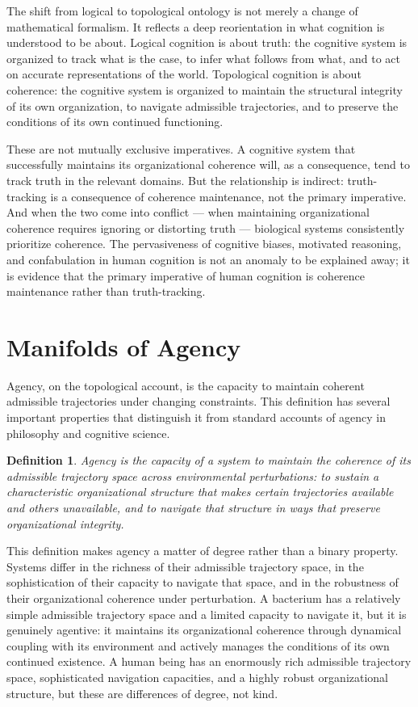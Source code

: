 \documentclass[12pt,a4paper]{report}
\theoremstyle{flyxion}
\newtheorem{definition}[theorem]{Definition}
\begin{document}
The shift from logical to topological ontology is not merely a change of mathematical formalism. It reflects a deep reorientation in what cognition is understood to be about. Logical cognition is about truth: the cognitive system is organized to track what is the case, to infer what follows from what, and to act on accurate representations of the world. Topological cognition is about coherence: the cognitive system is organized to maintain the structural integrity of its own organization, to navigate admissible trajectories, and to preserve the conditions of its own continued functioning.

These are not mutually exclusive imperatives. A cognitive system that successfully maintains its organizational coherence will, as a consequence, tend to track truth in the relevant domains. But the relationship is indirect: truth-tracking is a consequence of coherence maintenance, not the primary imperative. And when the two come into conflict --- when maintaining organizational coherence requires ignoring or distorting truth --- biological systems consistently prioritize coherence. The pervasiveness of cognitive biases, motivated reasoning, and confabulation in human cognition is not an anomaly to be explained away; it is evidence that the primary imperative of human cognition is coherence maintenance rather than truth-tracking.

\section{Manifolds of Agency}

Agency, on the topological account, is the capacity to maintain coherent admissible trajectories under changing constraints. This definition has several important properties that distinguish it from standard accounts of agency in philosophy and cognitive science.

\begin{definition}
\emph{Agency} is the capacity of a system to maintain the coherence of its admissible trajectory space across environmental perturbations: to sustain a characteristic organizational structure that makes certain trajectories available and others unavailable, and to navigate that structure in ways that preserve organizational integrity.
\end{definition}

This definition makes agency a matter of degree rather than a binary property. Systems differ in the richness of their admissible trajectory space, in the sophistication of their capacity to navigate that space, and in the robustness of their organizational coherence under perturbation. A bacterium has a relatively simple admissible trajectory space and a limited capacity to navigate it, but it is genuinely agentive: it maintains its organizational coherence through dynamical coupling with its environment and actively manages the conditions of its own continued existence. A human being has an enormously rich admissible trajectory space, sophisticated navigation capacities, and a highly robust organizational structure, but these are differences of degree, not kind.
\end{document}
